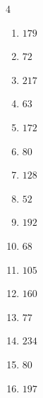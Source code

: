 \begin{multicols}{4}
\begin{enumerate}
  \item $179$


  \item $72$


  \item $217$


  \item $63$


\columnbreak %

  \item $172$


  \item $80$


  \item $128$


  \item $52$


  \item $192$


  \item $68$


  \item $105$


  \item $160$


  \item $77$


  \item $234$


  \item $80$


  \item $197$


\end{enumerate}
\end{multicols}
